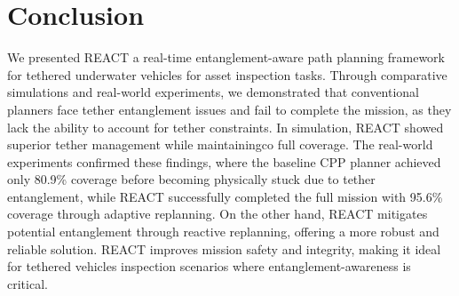 
\section{Conclusion}
\label{sec:conclusion}
We presented \ac{REACT} a real-time entanglement-aware path planning framework for tethered underwater vehicles for asset inspection tasks. Through comparative simulations and real-world experiments, we demonstrated that conventional planners face tether entanglement issues and fail to complete the mission, as they lack the ability to account for tether constraints. In simulation, \ac{REACT} showed superior tether management while maintainingco full coverage. The real-world experiments confirmed these findings, where the baseline \ac{CPP} planner achieved only 80.9\% coverage before becoming physically stuck due to tether entanglement, while \ac{REACT} successfully completed the full mission with 95.6\% coverage through adaptive replanning. On the other hand, \ac{REACT} mitigates potential entanglement through reactive replanning, offering a more robust and reliable solution. \ac{REACT} improves mission safety and integrity, making it ideal for tethered vehicles inspection scenarios where entanglement-awareness is critical.









